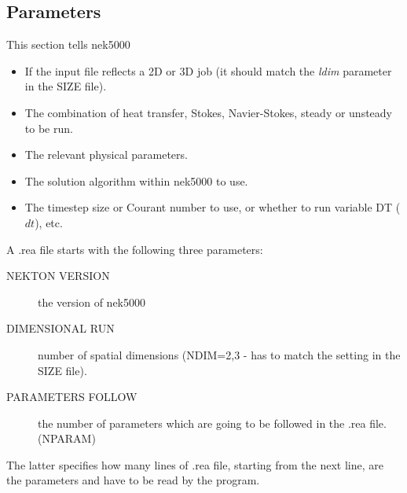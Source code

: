 \subsection{Parameters}
This section tells nek5000
\begin{itemize}
\item If the input file reflects a 2D or 3D job (it should match the \textit{ldim} parameter in the SIZE file).
\item The combination of heat transfer, Stokes, Navier-Stokes, steady or unsteady to be run.
\item The relevant physical parameters.
\item The solution algorithm within nek5000 to use.
\item The timestep size or Courant number to use, or whether to run variable DT (\(dt\)), etc.
\end{itemize}
A .rea file starts with the following three parameters:
\begin{description}
\item [NEKTON VERSION] the version of nek5000
\item [DIMENSIONAL RUN] number of spatial dimensions (NDIM=2,3 - has to match the setting in the SIZE file).
\item [PARAMETERS FOLLOW] the number of parameters which are going to be followed in the .rea file.(NPARAM)
\end{description}
The latter specifies how many lines of .rea file, starting from the next line, are the parameters and have to be read by the program.\\  

